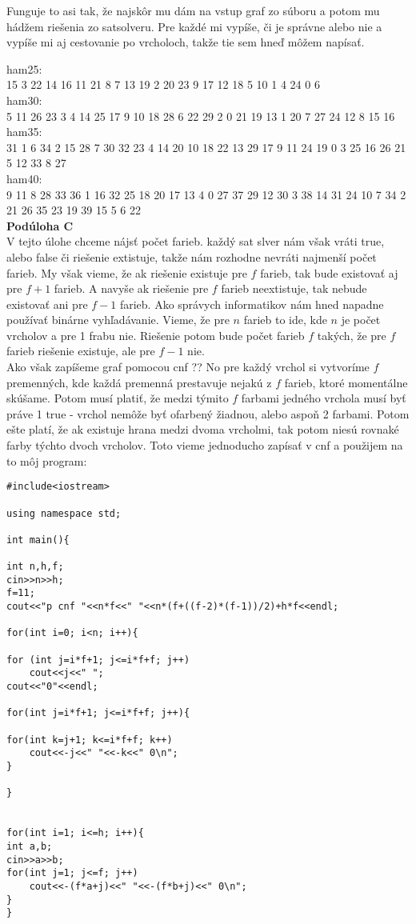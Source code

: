 \documentclass[a4paper,11pt]{article}
\begin{document}
Funguje to  asi tak, že najskôr mu dám na vstup graf zo súboru a potom mu hádžem riešenia zo satsolveru. Pre každé mi vypíše, či je správne alebo nie a vypíše mi aj cestovanie po vrcholoch, takže tie sem hneď môžem napísať.

ham25:\\
15 3 22 14 16 11 21 8 7 13 19 2 20 23 9 17 12 18 5 10 1 4 24 0 6\\

ham30:\\
5 11 26 23 3 4 14 25 17 9 10 18 28 6 22 29 2 0 21 19 13 1 20 7 27 24 12 8 15 16\\

ham35:\\
31 1 6 34 2 15 28 7 30 32 23 4 14 20 10 18 22 13 29 17 9 11 24 19 0 3 25 16 26 21 5 12 33 8 27\\

ham40:\\
9 11 8 28 33 36 1 16 32 25 18 20 17 13 4 0 27 37 29 12 30 3 38 14 31 24 10 7 34 2 21 26 35 23 19 39 15 5 6 22\\

\textbf{Podúloha C}\\
V tejto úlohe chceme nájsť počet farieb. každý sat slver nám však vráti true, alebo false či riešenie extistuje, takže nám rozhodne nevráti najmenší počet farieb. My však vieme, že ak riešenie existuje pre $f$ farieb, tak bude existovať aj pre $f+1$ farieb. A navyše ak riešenie pre $f$ farieb neextistuje, tak nebude existovať ani pre $f-1$ farieb. Ako správych informatikov nám hned napadne používať binárne vyhľadávanie. Vieme, že pre $n$ farieb to ide, kde $n$ je počet vrcholov a pre 1 frabu nie. Riešenie potom bude počet farieb $f$ takých, že pre $f$ farieb riešenie existuje, ale pre $f-1$ nie.\\
Ako však zapíšeme graf pomocou cnf ?? No pre každý vrchol si vytvoríme $f$ premenných, kde každá premenná prestavuje nejakú z $f$ farieb, ktoré momentálne skúšame. Potom musí platiť, že medzi týmito $f$ farbami jedného vrchola musí byť práve 1 true - vrchol nemôže byť ofarbený žiadnou, alebo aspoň 2 farbami.
Potom ešte platí, že ak existuje hrana medzi dvoma vrcholmi, tak potom niesú rovnaké farby týchto dvoch vrcholov.
Toto vieme jednoducho zapísať v cnf a použijem na to môj program:\\

\begin{lstlisting}
#include<iostream>

using namespace std;

int main(){

int n,h,f;
cin>>n>>h;
f=11;
cout<<"p cnf "<<n*f<<" "<<n*(f+((f-2)*(f-1))/2)+h*f<<endl;

for(int i=0; i<n; i++){

for (int j=i*f+1; j<=i*f+f; j++)
    cout<<j<<" ";
cout<<"0"<<endl;

for(int j=i*f+1; j<=i*f+f; j++){

for(int k=j+1; k<=i*f+f; k++)
    cout<<-j<<" "<<-k<<" 0\n";
}

}


for(int i=1; i<=h; i++){
int a,b;
cin>>a>>b;
for(int j=1; j<=f; j++)
    cout<<-(f*a+j)<<" "<<-(f*b+j)<<" 0\n";
}
}
\end{lstlisting}
\end{document}
